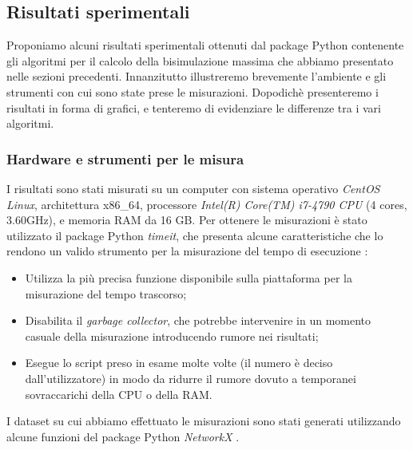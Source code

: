 \subsection{Risultati sperimentali}
Proponiamo alcuni risultati sperimentali ottenuti dal package Python contenente gli algoritmi per il calcolo della bisimulazione massima che abbiamo presentato nelle sezioni precedenti. Innanzitutto illustreremo brevemente l'ambiente e gli strumenti con cui sono state prese le misurazioni. Dopodichè presenteremo i risultati in forma di grafici, e tenteremo di evidenziare le differenze tra i vari algoritmi.

\subsubsection{Hardware e strumenti per le misura}
I risultati sono stati misurati su un computer con sistema operativo \emph{CentOS Linux}, architettura x86\_64, processore \emph{Intel(R) Core(TM) i7-4790 CPU} (4 cores, 3.60GHz), e memoria RAM da 16 GB. Per ottenere le misurazioni è stato utilizzato il package Python \emph{timeit}, che presenta alcune caratteristiche che lo rendono un valido strumento per la misurazione del tempo di esecuzione \cite{pythondocs}:
\begin{itemize}
    \item Utilizza la più precisa funzione disponibile sulla piattaforma per la misurazione del tempo trascorso;
    \item Disabilita il \emph{garbage collector}, che potrebbe intervenire in un momento casuale della misurazione introducendo rumore nei risultati;
    \item Esegue lo script preso in esame molte volte (il numero è deciso dall'utilizzatore) in modo da ridurre il rumore dovuto a temporanei sovraccarichi della CPU o della RAM.
\end{itemize}

I dataset su cui abbiamo effettuato le misurazioni sono stati generati utilizzando alcune funzioni del package Python \emph{NetworkX} \cite{networkx}.

